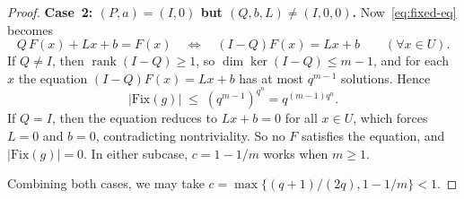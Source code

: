 \documentclass[10pt,a4paper]{amsart}
\newcommand{\Fix}{\mathrm{Fix}}
\newcommand{\rank}{\operatorname{rank}}
\begin{document}
\begin{proof}
\medskip
\noindent\textbf{Case~2: $(P,a)=(I,0)$ but $(Q,b,L)\neq(I,0,0)$.}
Now~\eqref{eq:fixed-eq} becomes
\[
   Q\,F(x) + Lx + b = F(x)
   \quad\Longleftrightarrow\quad
   (I-Q)F(x) = Lx + b
   \qquad(\forall x\in U).
\]
If $Q\neq I$, then $\rank(I-Q)\ge 1$, so $\dim\ker(I-Q)\le m-1$, and for each
$x$ the equation $(I-Q)F(x)=Lx+b$ has at most $q^{m-1}$ solutions. Hence
\[
   |\Fix(g)| \;\le\; (q^{m-1})^{q^n} = q^{(m-1)q^n}.
\]
If $Q=I$, then the equation reduces to $Lx+b=0$ for all $x\in U$, which forces
$L=0$ and $b=0$, contradicting nontriviality. So no $F$ satisfies the equation,
and $|\Fix(g)|=0$.
In either subcase, $c = 1 - 1/m$ works when $m\ge 1$.

Combining both cases, we may take $c=\max\bigl\{(q+1)/(2q),1-1/m\bigr\}<1$.
\end{proof}
\end{document}
